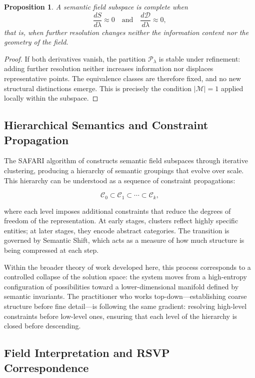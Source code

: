 \documentclass[11pt, twoside]{article}
\theoremstyle{plain}
\newtheorem{proposition}[theorem]{Proposition}
\theoremstyle{definition}
\theoremstyle{remark}
\begin{document}
\begin{proposition}
A semantic field subspace is complete when
\[
\frac{dS}{d\lambda} \approx 0 \quad \text{and} \quad \frac{d\mathcal{D}}{d\lambda} \approx 0,
\]
that is, when further resolution changes neither the information content nor the geometry of the field.
\end{proposition}

\begin{proof}
If both derivatives vanish, the partition $\mathcal{P}_\lambda$ is stable under refinement: adding further resolution neither increases information nor displaces representative points. The equivalence classes are therefore fixed, and no new structural distinctions emerge. This is precisely the condition $|\mathcal{M}| = 1$ applied locally within the subspace.
\end{proof}

\subsection{Hierarchical Semantics and Constraint Propagation}

The SAFARI algorithm of \cite{sun2025swallow} constructs semantic field subspaces through iterative clustering, producing a hierarchy of semantic groupings that evolve over scale. This hierarchy can be understood as a sequence of constraint propagations:

\[
\mathcal{C}_0 \subset \mathcal{C}_1 \subset \cdots \subset \mathcal{C}_k,
\]

where each level imposes additional constraints that reduce the degrees of freedom of the representation. At early stages, clusters reflect highly specific entities; at later stages, they encode abstract categories. The transition is governed by Semantic Shift, which acts as a measure of how much structure is being compressed at each step.

Within the broader theory of work developed here, this process corresponds to a controlled collapse of the solution space: the system moves from a high-entropy configuration of possibilities toward a lower-dimensional manifold defined by semantic invariants. The practitioner who works top-down---establishing coarse structure before fine detail---is following the same gradient: resolving high-level constraints before low-level ones, ensuring that each level of the hierarchy is closed before descending.

\subsection{Field Interpretation and RSVP Correspondence}
\end{document}
